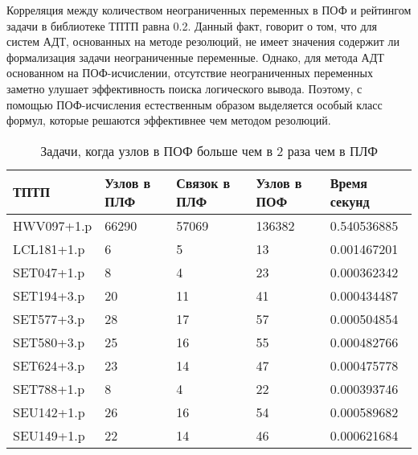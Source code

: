 \documentclass[a4paper]{jctart15b}
\begin{document}
Корреляция между количеством неограниченных переменных в ПОФ и рейтингом задачи в библиотеке ТПТП равна 0.2. Данный факт, говорит о том, что для систем АДТ, основанных на методе резолюций, не имеет значения содержит ли формализация задачи неограниченные переменные. Однако, для метода АДТ основанном на ПОФ-исчислении, отсутствие неограниченных переменных заметно улушает эффективность поиска логического вывода. Поэтому, с помощью ПОФ-исчисления естественным образом выделяется особый класс формул, которые решаются эффективнее чем методом резолюций.




%



%




\begin{table}[htbp]
	\caption{Задачи, когда узлов в ПОФ больше чем в 2 раза чем в ПЛФ}\vspace*{2mm}
	\begin{tabular}{|l|l|l|l|l|}
		\hline
		\textbf{ТПТП} & \textbf{Узлов в ПЛФ} & \textbf{Связок в ПЛФ} & \textbf{Узлов в ПОФ} & \textbf{Время секунд} \\
		\hline
		HWV097+1.p & 66290 & 57069 & 136382 & 0.540536885 \\
		\hline
		LCL181+1.p & 6 & 5 & 13 & 0.001467201 \\
		\hline
		SET047+1.p & 8 & 4 & 23 & 0.000362342 \\
		\hline
		SET194+3.p & 20 & 11 & 41 & 0.000434487 \\
		\hline
		SET577+3.p & 28 & 17 & 57 & 0.000504854 \\
		\hline
		SET580+3.p & 25 & 16 & 55 & 0.000482766 \\
		\hline
		SET624+3.p & 23 & 14 & 47 & 0.000475778 \\
		\hline
		SET788+1.p & 8 & 4 & 22 & 0.000393746 \\
		\hline
		SEU142+1.p & 26 & 16 & 54 & 0.000589682 \\
		\hline
		SEU149+1.p & 22 & 14 & 46 & 0.000621684 \\
		\hline
	\end{tabular}
\end{table}
\end{document}
